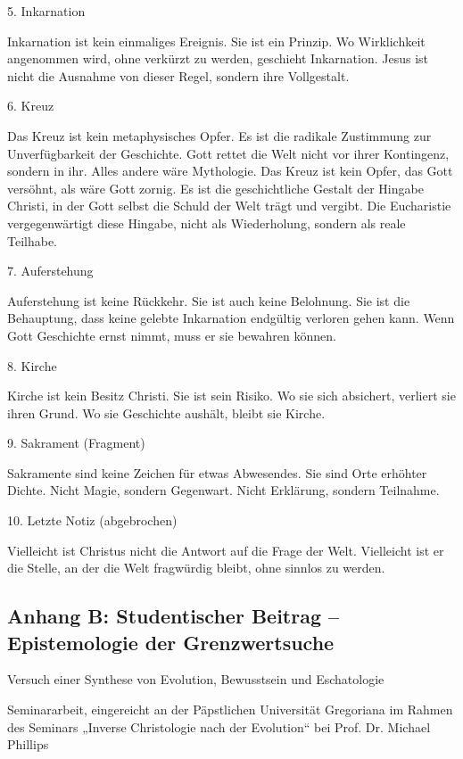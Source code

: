 \documentclass[
  ngerman,
]{article}
\begin{document}
5. Inkarnation

Inkarnation ist kein einmaliges Ereignis. Sie ist ein Prinzip. Wo
Wirklichkeit angenommen wird, ohne verkürzt zu werden, geschieht
Inkarnation. Jesus ist nicht die Ausnahme von dieser Regel, sondern ihre
Vollgestalt.

6. Kreuz

Das Kreuz ist kein metaphysisches Opfer. Es ist die radikale Zustimmung
zur Unverfügbarkeit der Geschichte. Gott rettet die Welt nicht vor ihrer
Kontingenz, sondern in ihr. Alles andere wäre Mythologie. Das Kreuz ist
kein Opfer, das Gott versöhnt, als wäre Gott zornig. Es ist die
geschichtliche Gestalt der Hingabe Christi, in der Gott selbst die
Schuld der Welt trägt und vergibt. Die Eucharistie vergegenwärtigt diese
Hingabe, nicht als Wiederholung, sondern als reale Teilhabe.

7. Auferstehung

Auferstehung ist keine Rückkehr. Sie ist auch keine Belohnung. Sie ist
die Behauptung, dass keine gelebte Inkarnation endgültig verloren gehen
kann. Wenn Gott Geschichte ernst nimmt, muss er sie bewahren können.

8. Kirche

Kirche ist kein Besitz Christi. Sie ist sein Risiko. Wo sie sich
absichert, verliert sie ihren Grund. Wo sie Geschichte aushält, bleibt
sie Kirche.

9. Sakrament (Fragment)

Sakramente sind keine Zeichen für etwas Abwesendes. Sie sind Orte
erhöhter Dichte. Nicht Magie, sondern Gegenwart. Nicht Erklärung,
sondern Teilnahme.

10. Letzte Notiz (abgebrochen)

Vielleicht ist Christus nicht die Antwort auf die Frage der Welt.
Vielleicht ist er die Stelle, an der die Welt fragwürdig bleibt, ohne
sinnlos zu werden.

\subsection{Anhang B: Studentischer Beitrag -- Epistemologie der
Grenzwertsuche}\label{anhang-b-studentischer-beitrag-epistemologie-der-grenzwertsuche}

Versuch einer Synthese von Evolution, Bewusstsein und Eschatologie

Seminararbeit, eingereicht an der Päpstlichen Universität Gregoriana im
Rahmen des Seminars „Inverse Christologie nach der Evolution`` bei Prof.
Dr. Michael Phillips
\end{document}
